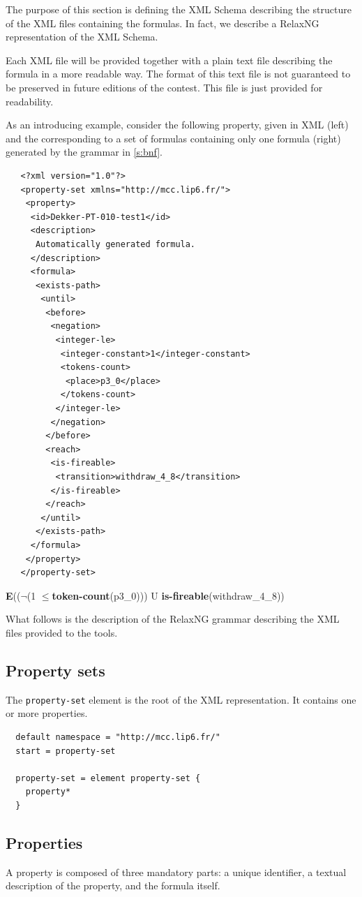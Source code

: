 \documentclass[10pt,english,a4paper]{article}
\newcommand\ctle             {\textbf{E}\xspace}
\newcommand\logicnot         {\boldmath$\lnot$\xspace}
\newcommand\atomleq          {\boldmath$\leq$\xspace}
\newcommand\atomisfire[1]    {\textbf{is-fireable}(#1)}
\newcommand\atomtokenscnt[1] {\textbf{token-count}(#1)}
\newcommand\mysubsection[1]{\color{sectioncolor}\subsection{#1}\color{defaultcolor}}
\begin{document}
The purpose of this section is defining the XML Schema describing the
structure of the XML files containing the formulas.
In fact, we describe a RelaxNG representation of the XML Schema.

Each XML file will be provided together with a plain text file describing
the formula in a more readable way.
The format of this text file is not guaranteed to be preserved in future
editions of the contest. This file is just provided for readability.

As an introducing example, consider the following property, given in XML
(left) and the corresponding to a set of formulas containing only one
formula (right) generated by the grammar in \cref{s:bnf}.

\begin{multicols}{2}
\begin{lstlisting}
   <?xml version="1.0"?>
   <property-set xmlns="http://mcc.lip6.fr/">
    <property>
     <id>Dekker-PT-010-test1</id>
     <description>
      Automatically generated formula.
     </description>
     <formula>
      <exists-path>
       <until>
        <before>
         <negation>
          <integer-le>
           <integer-constant>1</integer-constant>
           <tokens-count>
            <place>p3_0</place>
           </tokens-count>
          </integer-le>
         </negation>
        </before>
        <reach>
         <is-fireable>
          <transition>withdraw_4_8</transition>
         </is-fireable>
        </reach>
       </until>
      </exists-path>
     </formula>
    </property>
   </property-set>
\end{lstlisting}
\columnbreak
\vspace*{2cm}
\ctle ((\logicnot (1 \atomleq \atomtokenscnt{p3\_0})) U \atomisfire{withdraw\_4\_8})
\end{multicols}

What follows is the description of the RelaxNG grammar describing the XML
files provided to the tools.

\mysubsection{Property sets}
The \lstinline[language=xsd]!property-set! element is the root of the XML representation.
It contains one or more properties.
\begin{lstlisting}
  default namespace = "http://mcc.lip6.fr/"
  start = property-set

  property-set = element property-set {
    property*
  }
\end{lstlisting}

\mysubsection{Properties}
A property is composed of three mandatory parts: a unique identifier, a textual description
of the property, and the formula itself.
\end{document}
